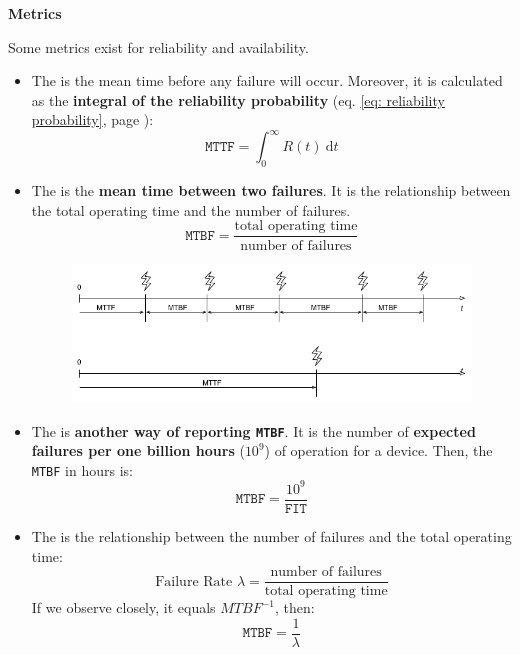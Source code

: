 \begin{flushleft}
    \textcolor{Red2}{ \textbf{Metrics}}
\end{flushleft}
Some metrics exist for reliability and availability.
\begin{itemize}
    \item The  is the mean time before any failure will occur. Moreover, it is calculated as the \textbf{integral of the reliability probability} (eq. \ref{eq: reliability probability}, page \pageref{eq: reliability probability}):
    \begin{equation}
        \texttt{MTTF} = \displaystyle\int_{0}^{\infty} R\left(t\right) \:\mathrm{d}t
    \end{equation}
    
    \item The  is the \textbf{mean time between two failures}. It is the relationship between the total operating time and the number of failures.
    \begin{equation}
        \texttt{MTBF} = \dfrac{\text{total operating time}}{\text{number of failures}}
    \end{equation}
    \begin{figure}[!htp]
        \centering
        \includegraphics[width=\textwidth]{img/reliability-and-availability-1.png}
    \end{figure}
    
    \item The  is \textbf{another way of reporting \texttt{MTBF}}. It is the number of \textbf{expected failures per one billion hours} ($10^9$) of operation for a device. Then, the \texttt{MTBF} in hours is:
    \begin{equation}
        \texttt{MTBF} = \dfrac{10^{9}}{\texttt{FIT}}
    \end{equation}
    
    \item The  is the relationship between the number of failures and the total operating time:
    \begin{equation}\label{eq: failure rate lambda}
        \text{Failure Rate }\lambda = \dfrac{\text{number of failures}}{\text{total operating time}}
    \end{equation}
    If we observe closely, it equals $MTBF^{-1}$, then:
    \begin{equation}
        \texttt{MTBF} = \dfrac{1}{\lambda}
    \end{equation}
\end{itemize}

